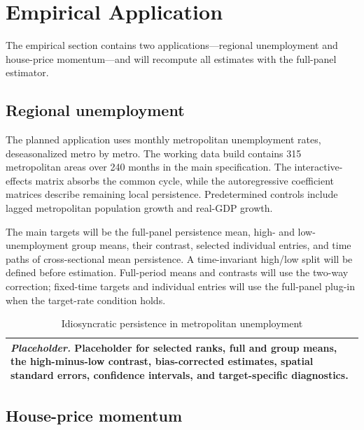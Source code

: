 \documentclass[11pt]{article}
\numberwithin{equation}{section}
\theoremstyle{remark}
\newcommand{\placeholdertable}[3]{%
\begin{table}[!htbp]
\centering
\caption{#1}
\label{#2}
\begin{tabular}{p{0.88\textwidth}}
\toprule
\textit{Placeholder.} #3\\
\bottomrule
\end{tabular}
\end{table}}
\begin{document}











\FloatBarrier

\section{Empirical Application}
\label{sec:application}

The empirical section contains two applications---regional unemployment and house-price momentum---and will recompute all estimates with the full-panel estimator.

\subsection{Regional unemployment}

The planned application uses monthly metropolitan unemployment rates, deseasonalized metro by metro. The working data build contains 315 metropolitan areas over 240 months in the main specification. The interactive-effects matrix absorbs the common cycle, while the autoregressive coefficient matrices describe remaining local persistence. Predetermined controls include lagged metropolitan population growth and real-GDP growth.

The main targets will be the full-panel persistence mean, high- and low-unemployment group means, their contrast, selected individual entries, and time paths of cross-sectional mean persistence. A time-invariant high/low split will be defined before estimation. Full-period means and contrasts will use the two-way correction; fixed-time targets and individual entries will use the full-panel plug-in when the target-rate condition holds.

\placeholdertable{Idiosyncratic persistence in metropolitan unemployment}{tab:emp_unemployment}{Placeholder for selected ranks, full and group means, the high-minus-low contrast, bias-corrected estimates, spatial standard errors, confidence intervals, and target-specific diagnostics.}

\subsection{House-price momentum}
\end{document}
